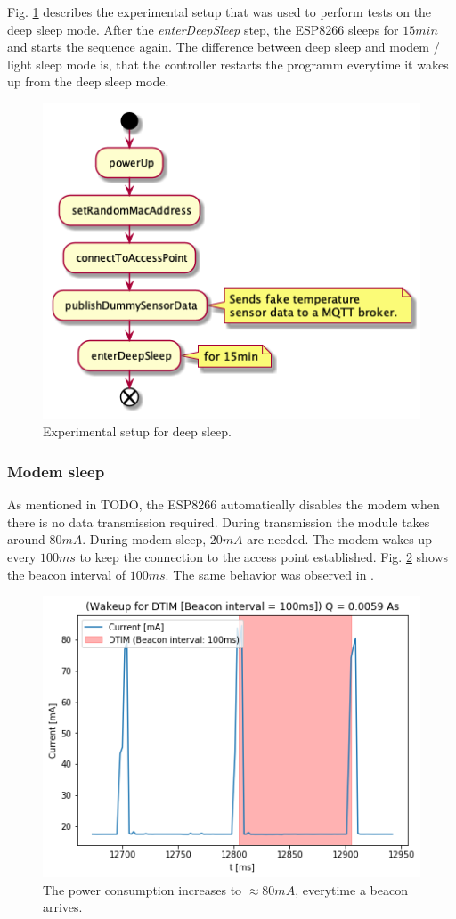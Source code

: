 Fig. \ref{fig:experiment_deep_sleep} describes the experimental setup that was used to perform tests on the deep sleep mode.
After the \textit{enterDeepSleep} step, the ESP8266 sleeps for $15min$ and starts the sequence again.
The difference between deep sleep and modem / light sleep mode is, that the controller restarts the programm everytime it wakes up from the deep sleep mode.
\begin{figure}[h]
    \centering
    \includegraphics[width = 0.7 \linewidth]{fig/sequence_deep_sleep.png}
    \caption{Experimental setup for deep sleep.}
    \label{fig:experiment_deep_sleep}
\end{figure}

\subsubsection{Modem sleep}
As mentioned in TODO, the ESP8266 automatically disables the modem when there is no data transmission required.
During transmission the module takes around $80mA$. During modem sleep, $20mA$ are needed.
The modem wakes up every $100ms$ to keep the connection to the access point established.
Fig. \ref{fig:beacon_interval} shows the beacon interval of $100ms$. 
The same behavior was observed in \cite{montori_is_2017}.

\begin{figure}[h]
    \includegraphics[width = \linewidth]{fig/beacon_interval.png}
    \caption{The power consumption increases to $\approx 80mA$, everytime a beacon arrives.}
    \label{fig:beacon_interval}
\end{figure}

